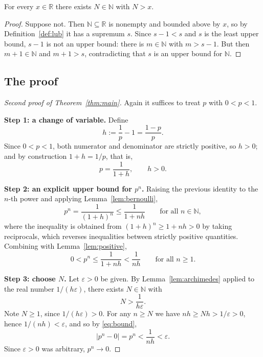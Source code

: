 \documentclass{essay}
\begin{document}
\begin{lemma}\label{lem:archimedes}
  For every \(x \in \mathbb{R}\) there exists \(N \in \mathbb{N}\) with \(N > x\).
\end{lemma}

\begin{proof}
  Suppose not. Then \(\mathbb{N} \subseteq \mathbb{R}\) is nonempty and bounded above by
  \(x\), so by Definition~\ref{def:lub} it has a supremum \(s\). Since \(s - 1 < s\) and \(s\)
  is the least upper bound, \(s - 1\) is not an upper bound: there is \(m \in \mathbb{N}\)
  with \(m > s - 1\). But then \(m + 1 \in \mathbb{N}\) and \(m + 1 > s\), contradicting
  that \(s\) is an upper bound for \(\mathbb{N}\).
\end{proof}

\subsection{The proof}

\begin{proof}[Second proof of Theorem~\ref{thm:main}]
  Again it suffices to treat \(p\) with \(0 < p < 1\).

  \medskip
  \noindent\textbf{Step 1: a change of variable.}
  Define
  \[ h := \frac{1}{p} - 1 = \frac{1 - p}{p}. \]
  Since \(0 < p < 1\), both numerator and denominator are strictly positive, so \(h > 0\);
  and by construction \(1 + h = 1/p\), that is,
  \[ p = \frac{1}{1 + h}, \qquad h > 0. \]

  \medskip
  \noindent\textbf{Step 2: an explicit upper bound for \(p^{n}\).}
  Raising the previous identity to the \(n\)-th power and applying
  Lemma~\ref{lem:bernoulli},
  \[ p^{n} = \frac{1}{(1+h)^{n}} \leq \frac{1}{1 + nh} \qquad \text{for all } n \in \mathbb{N}, \]
  where the inequality is obtained from \((1+h)^{n} \geq 1 + nh > 0\) by taking
  reciprocals, which reverses inequalities between strictly positive quantities.
  Combining with Lemma~\ref{lem:positive},
  \begin{equation}\label{eq:bound}
    0 < p^{n} \leq \frac{1}{1 + nh} < \frac{1}{nh}
    \qquad \text{for all } n \geq 1 .
  \end{equation}

  \medskip
  \noindent\textbf{Step 3: choose \(N\).}
  Let \(\varepsilon > 0\) be given. By Lemma~\ref{lem:archimedes} applied to the real
  number \(1 / (h\varepsilon)\), there exists \(N \in \mathbb{N}\) with
  \[ N > \frac{1}{h \varepsilon} . \]
  Note \(N \geq 1\), since \(1/(h\varepsilon) > 0\). For any \(n \geq N\) we have
  \(nh \geq Nh > 1/\varepsilon > 0\), hence \(1/(nh) < \varepsilon\), and so
  by \eqref{eq:bound},
  \[ |p^{n} - 0| = p^{n} < \frac{1}{nh} < \varepsilon . \]
  Since \(\varepsilon > 0\) was arbitrary, \(p^{n} \to 0\).
\end{proof}
\end{document}
